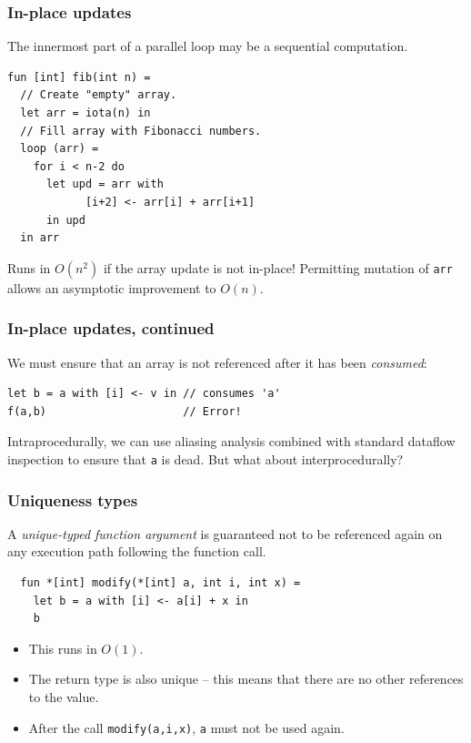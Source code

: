 \documentclass{beamer}
\begin{document}
\begin{frame}[fragile]
  \frametitle{In-place updates}

  The innermost part of a parallel loop may be a sequential
  computation.

  \begin{lstlisting}
fun [int] fib(int n) =
  // Create "empty" array.
  let arr = iota(n) in
  // Fill array with Fibonacci numbers.
  loop (arr) =
    for i < n-2 do
      let upd = arr with
            [i+2] <- arr[i] + arr[i+1]
      in upd
  in arr
\end{lstlisting}

Runs in $O(n^{2})$ if the array update is not in-place!  Permitting
mutation of \texttt{arr} allows an asymptotic improvement to $O(n)$.

\end{frame}

\begin{frame}[fragile]
  \frametitle{In-place updates, continued}

  We must ensure that an array is not referenced after it has been
  \textit{consumed}:

  \begin{lstlisting}
let b = a with [i] <- v in // consumes 'a'
f(a,b)                     // Error!
\end{lstlisting}

Intraprocedurally, we can use aliasing analysis combined with standard
dataflow inspection to ensure that \texttt{a} is dead.  But what about
interprocedurally?

\end{frame}

\begin{frame}[fragile]
  \frametitle{Uniqueness types}

  A \textit{unique-typed function argument} is guaranteed not to be
  referenced again on any execution path following the function call.

  \begin{lstlisting}
  fun *[int] modify(*[int] a, int i, int x) =
    let b = a with [i] <- a[i] + x in
    b
\end{lstlisting}

\begin{itemize}
\item This runs in $O(1)$.

\item The return type is also unique -- this means that there are no
  other references to the value.

\item After the call \texttt{modify(a,i,x)}, \texttt{a} must not be
  used again.
\end{itemize}

\end{frame}
\end{document}
